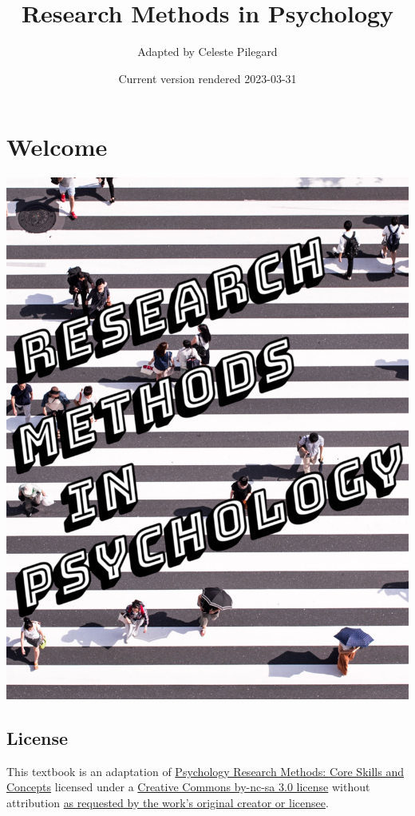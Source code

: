 \documentclass[
]{krantz}
\title{Research Methods in Psychology}
\author{Adapted by Celeste Pilegard}
\date{Current version rendered 2023-03-31}
\begin{document}
\maketitle

{
\setcounter{tocdepth}{1}
\tableofcontents
}
\hypertarget{welcome}{%
\chapter*{Welcome}\label{welcome}}


\includegraphics{images/cover.png}

\hypertarget{license}{%
\section*{License}\label{license}}


This textbook is an adaptation of \href{https://2012books.lardbucket.org/books/psychology-research-methods-core-skills-and-concepts/}{Psychology Research Methods: Core Skills and Concepts} licensed under a \href{https://creativecommons.org/licenses/by-nc-sa/3.0/}{Creative Commons by-nc-sa 3.0 license} without attribution \href{https://2012books.lardbucket.org/attribution.html}{as requested by the work's original creator or licensee}.
\end{document}
